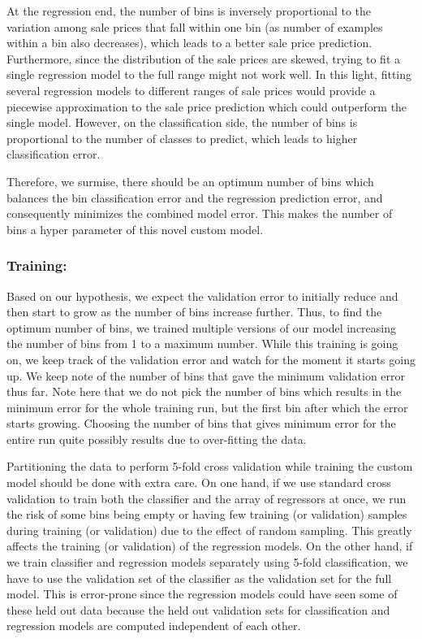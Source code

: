 \documentclass[conference,compsoc]{IEEEtran}
\begin{document}
\par
At the regression end, the number of bins is inversely proportional to the variation among sale prices that fall within one bin (as number of examples within a bin also decreases), which leads to a better sale price prediction. Furthermore, since the distribution of the sale prices are skewed, trying to fit a single regression model to the full range might not work well. In this light, fitting several regression models to different ranges of sale prices would provide a piecewise approximation to the sale price prediction which could outperform the single model.
However, on the classification side, the number of bins is proportional to the number of classes to predict, which leads to higher classification error.

\par
Therefore, we surmise, there should be an optimum number of bins which balances the bin classification error and the regression prediction error, and consequently minimizes the combined model error. This makes the number of bins a hyper parameter of this novel custom model. 

\subsubsection{Training:} 

\par
Based on our hypothesis, we expect the validation error to initially reduce and then start to grow as the number of bins increase further. Thus, to find the optimum number of bins, we trained multiple versions of our model increasing the number of bins from 1 to a maximum number. While this training is going on, we keep track of the validation error and watch for the moment it starts going up. We keep note of the number of bins that gave the minimum validation error thus far. Note here that we do not pick the number of bins which results in the minimum error for the whole training run, but the first bin after which the error starts growing. Choosing the number of bins that gives minimum error for the entire run quite possibly results due to over-fitting the data.

\par
Partitioning the data to perform 5-fold cross validation while training the custom model should be done with extra care. On one hand, if we use standard cross validation to train both the classifier and the array of regressors at once, we run the risk of some bins being empty or having few training (or validation) samples during training (or validation) due to the effect of random sampling. This greatly affects the training (or validation) of the regression models. On the other hand, if we train classifier and regression models separately using 5-fold classification, we have to use the validation set of the classifier as the validation set for the full model. This is error-prone since the regression models could have seen some of these held out data because the held out validation sets for classification and regression models are computed independent of each other.
\end{document}
